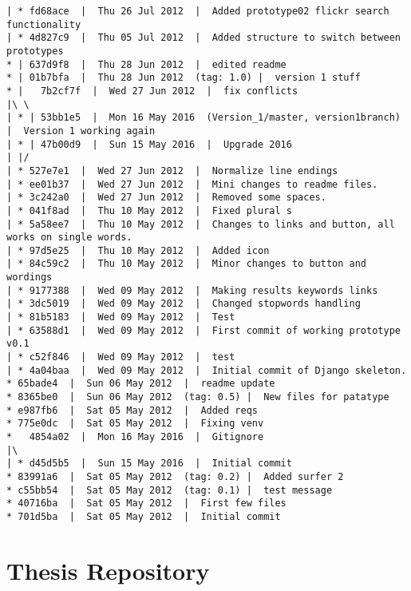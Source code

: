 \begin{verbatim}
| * fd68ace  |  Thu 26 Jul 2012  |  Added prototype02 flickr search functionality
| * 4d827c9  |  Thu 05 Jul 2012  |  Added structure to switch between prototypes
* | 637d9f8  |  Thu 28 Jun 2012  |  edited readme
* | 01b7bfa  |  Thu 28 Jun 2012  (tag: 1.0) |  version 1 stuff
* |   7b2cf7f  |  Wed 27 Jun 2012  |  fix conflicts
|\ \  
| * | 53bb1e5  |  Mon 16 May 2016  (Version_1/master, version1branch) |  Version 1 working again
| * | 47b00d9  |  Sun 15 May 2016  |  Upgrade 2016
| |/  
| * 527e7e1  |  Wed 27 Jun 2012  |  Normalize line endings
| * ee01b37  |  Wed 27 Jun 2012  |  Mini changes to readme files.
| * 3c242a0  |  Wed 27 Jun 2012  |  Removed some spaces.
| * 041f8ad  |  Thu 10 May 2012  |  Fixed plural s
| * 5a58ee7  |  Thu 10 May 2012  |  Changes to links and button, all works on single words.
| * 97d5e25  |  Thu 10 May 2012  |  Added icon
| * 84c59c2  |  Thu 10 May 2012  |  Minor changes to button and wordings
| * 9177388  |  Wed 09 May 2012  |  Making results keywords links
| * 3dc5019  |  Wed 09 May 2012  |  Changed stopwords handling
| * 81b5183  |  Wed 09 May 2012  |  Test
| * 63588d1  |  Wed 09 May 2012  |  First commit of working prototype v0.1
| * c52f846  |  Wed 09 May 2012  |  test
| * 4a04baa  |  Wed 09 May 2012  |  Initial commit of Django skeleton.
* 65bade4  |  Sun 06 May 2012  |  readme update
* 8365be0  |  Sun 06 May 2012  (tag: 0.5) |  New files for patatype
* e987fb6  |  Sat 05 May 2012  |  Added reqs
* 775e0dc  |  Sat 05 May 2012  |  Fixing venv
*   4854a02  |  Mon 16 May 2016  |  Gitignore
|\  
| * d45d5b5  |  Sun 15 May 2016  |  Initial commit
* 83991a6  |  Sat 05 May 2012  (tag: 0.2) |  Added surfer 2
* c55bb54  |  Sat 05 May 2012  (tag: 0.1) |  test message
* 40716ba  |  Sat 05 May 2012  |  First few files
* 701d5ba  |  Sat 05 May 2012  |  Initial commit
\end{verbatim}


\section{Thesis Repository}

